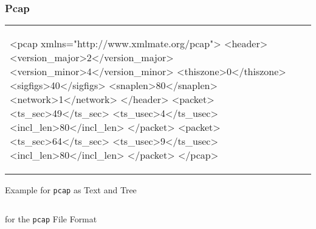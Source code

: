 \subsubsection{Pcap}
\label{sec:formats:pcap}
\begin{listing}[H]
\centering
\begin{tabular}{|m{4.5cm}m{8cm}|}
\begin{xmlcode}
<pcap xmlns="http://www.xmlmate.org/pcap">
	<header>
		<version_major>2</version_major>
		<version_minor>4</version_minor>
		<thiszone>0</thiszone>
		<sigfigs>40</sigfigs>
		<snaplen>80</snaplen>
		<network>1</network>
	</header>
	<packet>
		<ts_sec>49</ts_sec>
		<ts_usec>4</ts_usec>
		<incl_len>80</incl_len>
	</packet>
	<packet>
		<ts_sec>64</ts_sec>
		<ts_usec>9</ts_usec>
		<incl_len>80</incl_len>
	</packet>
</pcap>
\end{xmlcode}
&
\begin{tikzpicture}[grow=right]
\tikzset{level distance=68pt,sibling distance=0pt}
\tikzset{execute at begin node=\strut}
	\Tree [.pcap 
[.packet [.incl\_len 80 ] [.ts\_usec 9 ] [.ts\_sec 64 ] ]
[.packet [.incl\_len 80 ] [.ts\_usec 4 ] [.ts\_sec 49 ] ]
[.header [.network 1 ] [.snaplen 80 ] [.sigfigs 40 ] [.thiszone 0 ] [.version\_minor 4 ] [.version\_major 2 ] ]
]
\end{tikzpicture}
\end{tabular}
\caption{Example \xml for \texttt{pcap} as Text and Tree}
\label{lst:xmlexample}
\end{listing}

\begin{listing}[H]
\centering
\inputminted[frame=lines,fontsize=\small]{xml}{../subjects/pcap/schema/pcap.xsd}
\caption{\xsd for the \texttt{pcap} File Format}
\label{lst:xsdexample}
\end{listing}

 